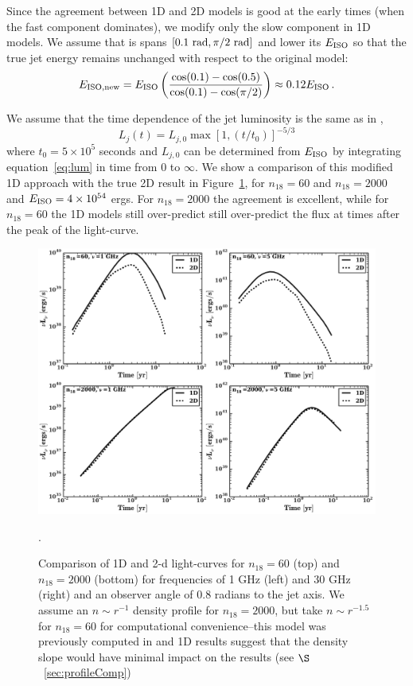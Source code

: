 \documentclass[usenatbib,fleqn]{mnras}
\begin{document}
Since the agreement between 1D and 2D models is good at the early
times (when the fast component dominates), we modify only the slow
component in 1D models. We assume that is spans $[0.1\ {\rm rad},
\pi/2\ {\rm rad}]$ and lower its $E_{\rm ISO}$ so that the true jet
energy remains unchanged with respect to the original model:
\begin{equation}\label{eq:Eiso}
 E_{\rm ISO, new} = E_{\rm ISO} \left(\frac{\cos(0.1) - \cos(0.5)}{\cos(0.1) - \cos(\pi/2)}\right)\approx 0.12 E_{\rm ISO}\, .
\end{equation}

We assume that the time dependence of the jet luminosity is the same as in
\citet{Mimica+2015},
\begin{equation}\label{eq:lum}
L_j(t) = L_{j,0}\max\left[1, (t/t_0)\right]^{-5/3}
\end{equation}
where $t_0 = 5\times 10^5$ seconds and $L_{j, 0}$ can be determined
from $E_{\rm ISO}$ by integrating equation~\ref{eq:lum} in time from
$0$ to $\infty$. We show a comparison of this modified 1D approach
with the true 2D result in Figure~\ref{fig:1d2dB}, for $n_{18}=60$ and
$n_{18}=2000$ and $E_{\rm ISO}=4 \times 10^{54}$ ergs. For
$n_{18}=2000$ the agreement is excellent, while for $n_{18}=60$ the 1D
models still over-predict still over-predict the flux at times after
the peak of the light-curve.


\begin{figure}
\includegraphics[width=16cm]{1d_2d.pdf}
\caption{\label{fig:1d2dB} Comparison of 1D and 2-d light-curves for
  $n_{18}=60$ (top) and $n_{18}=2000$ (bottom) for frequencies of 1
  GHz (left) and 30 GHz (right) and an observer angle of 0.8 radians
  to the jet axis. We assume an $n\sim r^{-1}$ density profile for
  $n_{18}=2000$, but take $n\sim r^{-1.5}$ for $n_{18}=60$ for
  computational convenience--this model was previously computed in
  \citet{Mimica+2015} and 1D results suggest that the density slope would
  have minimal impact on the results (see $\S$~\ref{sec:profileComp})}.
\end{figure}
\end{document}
